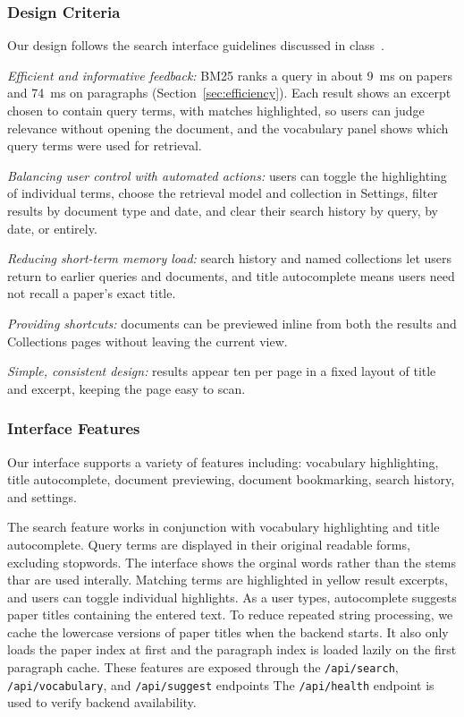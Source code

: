 \documentclass[sigconf,nonacm]{acmart}
\begin{document}
\subsubsection{Design Criteria}
Our design follows the search interface guidelines discussed in
class~\cite{hearst2009search}.\

\emph{Efficient and informative feedback:} BM25 ranks a query in about
9~ms on papers and 74~ms on paragraphs (Section~\ref{sec:efficiency}).
Each result shows an excerpt chosen to contain query terms, with matches
highlighted, so users can judge relevance without opening the document,
and the vocabulary panel shows which query terms were used for retrieval.\

\emph{Balancing user control with automated actions:} users can toggle
the highlighting of individual terms, choose the retrieval model and
collection in Settings, filter results by document type and date, and
clear their search history by query, by date, or entirely.\

\emph{Reducing short-term memory load:} search history and named
collections let users return to earlier queries and documents, and title
autocomplete means users need not recall a paper's exact title. \

\emph{Providing shortcuts:} documents can be previewed inline from both
the results and Collections pages without leaving the current view. \

\emph{Simple, consistent design:} results appear ten per page in a fixed
layout of title and excerpt, keeping the page easy to scan.

\subsubsection{Interface Features}
Our interface supports a variety of features including: vocabulary highlighting, title autocomplete, 
document previewing, document bookmarking, search history, and settings.

The search feature works in conjunction with vocabulary highlighting and title autocomplete.
Query terms are displayed in their original readable forms, excluding stopwords. 
The interface shows the orginal words rather than the stems thar are used interally.
Matching terms are highlighted in yellow result excerpts, and users can toggle individual highlights. 
As a user types, autocomplete suggests paper titles containing the entered text. 
To reduce repeated string processing, we cache the lowercase versions of paper titles when the backend starts. It also only loads the paper index at first and the paragraph index is loaded lazily on the first paragraph cache.
These features are exposed through the \texttt{/api/search}, \texttt{/api/vocabulary}, and \texttt{/api/suggest} endpoints
The \texttt{/api/health} endpoint is used to verify backend availability. 
\end{document}
